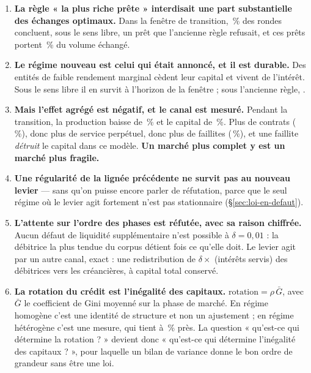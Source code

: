 \documentclass[11pt,a4paper]{article}
\begin{document}
\begin{enumerate}
\item \textbf{La règle « la plus riche prête » interdisait une part
  substantielle des échanges optimaux.} Dans la fenêtre de transition,
  \pctReversalAhcentCinquanteTransition\,\% des rondes concluent, sous le sens
  libre, un prêt que l'ancienne règle refusait, et ces prêts portent
  \pctVolumeRevAhcentCinquanteTransition\,\% du volume échangé.
\item \textbf{Le régime nouveau est celui qui était annoncé, et il est
  durable.} Des entités de faible rendement marginal cèdent leur capital et
  vivent de l'intérêt. Sous le sens libre il en survit
  \techZeroFreeAhcentCinquanteResiduel{} à l'horizon de la fenêtre ; sous
  l'ancienne règle, \techZeroVoneAhcentCinquanteResiduel{}.
\item \textbf{Mais l'effet agrégé est négatif, et le canal est mesuré.}
  Pendant la transition, la production baisse de
  \diffProdAhcentCinquanteTransition\,\% et le capital de
  \diffKtotAhcentCinquanteTransition\,\%. Plus de contrats
  (\diffNLoansAhcentCinquanteTransition\,\%), donc plus de service perpétuel,
  donc plus de faillites (\diffMortAhcentCinquanteTransition\,\%), et une
  faillite \emph{détruit} le capital dans ce modèle. \textbf{Un marché plus
  complet y est un marché plus fragile.}
\item \textbf{Une régularité de la lignée précédente ne survit pas au nouveau
  levier} --- sans qu'on puisse encore parler de réfutation, parce que le seul
  régime où le levier agit fortement n'est pas stationnaire
  (§\ref{sec:loi-en-defaut}).
\item \textbf{L'attente sur l'ordre des phases est réfutée, avec sa raison
  chiffrée.} Aucun défaut de liquidité supplémentaire n'est possible à
  $\delta = 0{,}01$ : la débitrice la plus tendue du corpus détient
  \ratioMinResiduel{} fois ce qu'elle doit. Le levier agit par un autre canal,
  exact : une redistribution de $\delta \times$ (intérêts servis) des
  débitrices vers les créancières, à capital total conservé.
\item \textbf{La rotation du crédit est l'inégalité des capitaux.}
  $\text{rotation} = \rho\,\bar G$, avec $\bar G$ le coefficient de Gini
  moyenné sur la phase de marché. En régime homogène c'est une identité de
  structure et non un ajustement ; en régime hétérogène c'est une mesure, qui
  tient à \heteroFreeMed\,\% près. La question « qu'est-ce qui détermine la
  rotation ? » devient donc « qu'est-ce qui détermine l'inégalité des
  capitaux ? », pour laquelle un bilan de variance donne le bon ordre de
  grandeur sans être une loi.
\end{enumerate}
\end{document}
